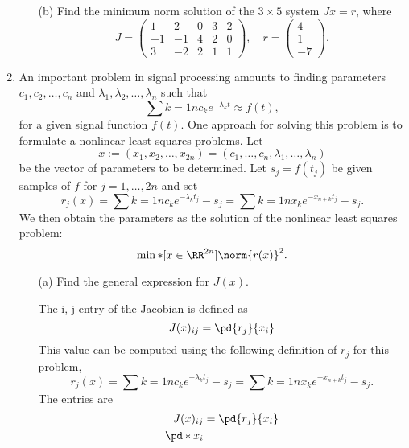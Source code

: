 \documentclass[11pt, oneside]{article}
\begin{document}
\begin{enumerate}
\begin{enumerate}
      \item[(b)]
        Find the minimum norm solution of the $3 \times 5$ system $Jx = r$,
        where
        \[
          J =
          \begin{pmatrix}
            1 & 2 & 0 & 3 & 2 \\
            -1 & -1 & 4 & 2 & 0 \\
            3 & -2 & 2 & 1 & 1
          \end{pmatrix},
          \quad
          r =
          \begin{pmatrix}
            4 \\
            1 \\
            -7
          \end{pmatrix}.
        \]
    \end{enumerate}

  \item %
    An important problem in signal processing amounts to finding parameters
    $c_1, c_2, \ldots, c_n$ and $\lambda_1, \lambda_2, \ldots, \lambda_n$ such
    that
    \[
      \sum{k=1}{n}{c_k e^{-\lambda_k t}} \approx f(t),
    \]
    for a given signal function $f(t)$.
    One approach for solving this problem is to formulate a nonlinear least
    squares problems.
    Let
    \[
      x := (x_1, x_2, \ldots, x_{2n}) = (c_1, \ldots, c_n, \lambda_1, \ldots, \lambda_n)
    \]
    be the vector of parameters to be determined.
    Let $s_j = f(t_j)$ be given samples of $f$ for $j = 1,\ldots,2n$ and set
    \[
      r_j(x) = \sum{k=1}{n}{c_k e^{-\lambda_k t_j}} - s_j = \sum{k=1}{n}{x_k e^{-x_{n+k}t_j}} - s_j.
    \]
    We then obtain the parameters as the solution of the nonlinear least squares
    problem:
    \[
      \min*[x \in \RR^{2n}]{\norm{r(x)}^2}.
    \]
    \begin{enumerate}
      \item[(a)]
        Find the general expression for $J(x)$.

        The i, j entry of the Jacobian is defined as
        \[
          J(x)_{ij} = \pd{r_j}{x_i}
        \]
        This value can be computed using the following definition of $r_j$ for
        this problem,
        \[
          r_j(x) = \sum{k=1}{n}{c_k e^{-\lambda_k t_j}} - s_j = \sum{k=1}{n}{x_k e^{-x_{n+k}t_j}} - s_j.
        \]
        The entries are
        \begin{align*}
          J(x)_{ij} &= \pd{r_j}{x_i} \\
          \pd*{}{x_i}
        \end{align*}


\end{enumerate}
\end{enumerate}
\end{document}
